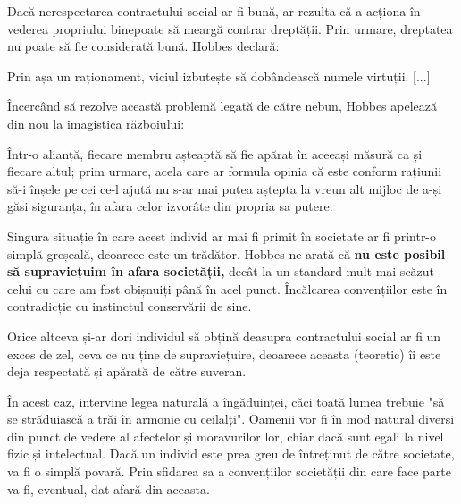 \documentclass[12pt]{article}
\begin{document}
	 	Dacă nerespectarea contractului social ar fi bună, ar rezulta că a acționa în vederea propriului \dedouble bine\sqtworight poate să meargă contrar dreptății. Prin urmare, dreptatea nu poate să fie considerată bună. Hobbes declară:\par
	 	
	 	\begin{displayquote}
	 		Prin așa un raționament, viciul izbutește să dobândească numele virtuții. [...]
	 	\end{displayquote}
	 	
	 	Încercând să rezolve această problemă legată de către \dedouble nebun\sqtworight \parencite[p.52]{Hobbesa}, Hobbes apelează din nou la imagistica războiului:\par
	 	
	 	\begin{displayquote}
	 		Într-o alianță, fiecare membru așteaptă să fie apărat în aceeași măsură ca și fiecare altul; prim urmare, acela care ar formula opinia că este conform rațiunii să-i înșele pe cei ce-l ajută nu s-ar mai putea aștepta la vreun alt mijloc de a-și găsi siguranța, în afara celor izvorâte din propria sa putere.
	 	\end{displayquote}
	 	
	 	Singura situație în care acest individ ar mai fi primit în societate ar fi printr-o simplă greșeală, deoarece este un trădător. Hobbes ne arată că \textbf{nu este posibil să supraviețuim în afara societății,} decât la un standard mult mai scăzut celui cu care am fost obișnuiți până în acel punct. Încălcarea convențiilor este în contradicție cu instinctul conservării de sine.\par
	 	
	 	Orice altceva și-ar dori individul să obțină deasupra contractului social ar fi un exces de zel, ceva ce nu ține de supraviețuire, deoarece aceasta (teoretic) îi este deja respectată și apărată de către suveran.\par
	 	
	 	În acest caz, intervine legea naturală a îngăduinței, căci toată lumea trebuie "să se străduiască a trăi în armonie cu ceilalți". Oamenii vor fi în mod natural diverși din punct de vedere al afectelor și moravurilor lor, chiar dacă sunt egali la nivel fizic și intelectual. Dacă un individ este prea greu de întreținut de către societate, va fi o simplă povară. Prin sfidarea sa a convențiilor societății din care face parte va fi, eventual, dat afară din aceasta.
	 	
\end{document}
